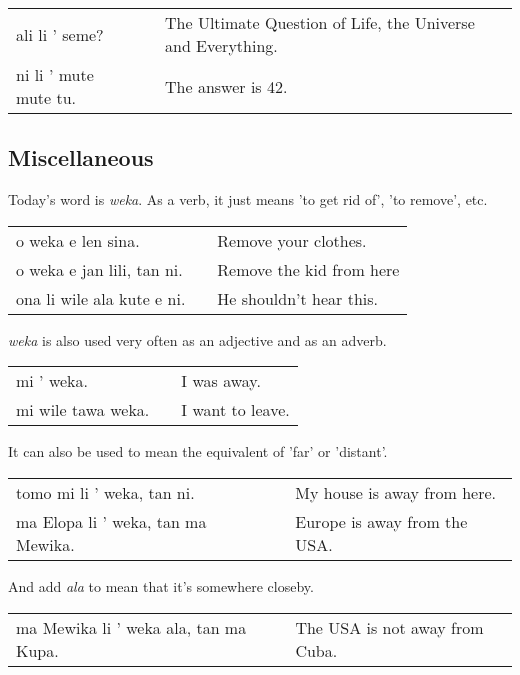 \begin{supertabular}{p{5,5cm}|ll}
ali li ' seme? &&  The Ultimate Question of Life, the Universe and Everything. \\
ni li ' mute mute tu.  && The answer is 42. \\
\end{supertabular} 

%
\newpage
\subsection*{Miscellaneous}
%
Today's word is \textit{weka}. 
As a verb, it just means 'to get rid of', 'to remove', etc. 

\begin{supertabular}{p{5,5cm}|ll}
o weka e len sina. && Remove your clothes. \\
o weka e jan lili, tan ni. && Remove the kid from here \\ 
ona li wile ala kute e ni. && He shouldn't hear this. \\ 
\end{supertabular} 

\textit{weka} is also used very often as an adjective and as an adverb. 

\begin{supertabular}{p{5,5cm}|ll}
mi ' weka. && I was away. \\
mi wile tawa weka. && I want to leave. \\
\end{supertabular} 

It can also be used to mean the equivalent of 'far' or 'distant'. 

\begin{supertabular}{p{5,5cm}|ll}
tomo mi li ' weka, tan ni. && My house is away from here. \\
ma Elopa li ' weka, tan ma Mewika. && Europe is away from the USA. \\
\end{supertabular} 

And add \textit{ala} to mean that it's somewhere closeby. 

\begin{supertabular}{p{5,5cm}|ll}
ma Mewika li ' weka ala, tan ma Kupa. && The USA is not away from Cuba. \\
\end{supertabular} 

